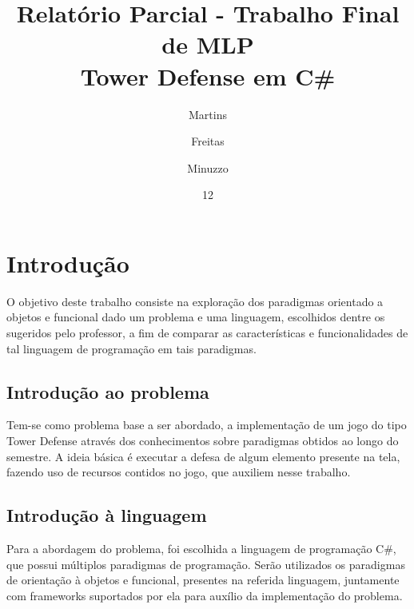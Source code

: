 \documentclass[rel_mlp]{iiufrgs}
\title{%
  Relatório Parcial - Trabalho Final de MLP \\
  \large Tower Defense em C#}
\author{Martins}{Pedro} %
\author{Freitas}{Pietra} %
\author{Minuzzo}{Thayná} %
\date{12}{2017}
\begin{document}
\maketitle      



\tableofcontents






%
\chapter{Introdução} \label{intro}

O objetivo deste trabalho consiste na exploração dos paradigmas orientado a objetos e funcional dado um problema e uma linguagem, escolhidos dentre os sugeridos pelo professor, a fim de comparar as características e funcionalidades de tal linguagem de programação em tais paradigmas. 

\section{Introdução ao problema}

Tem-se como problema base a ser abordado, a implementação de um jogo do tipo Tower Defense através dos conhecimentos sobre paradigmas obtidos ao longo do semestre. A ideia básica é executar a defesa de algum elemento presente na tela, fazendo uso de recursos contidos no jogo, que auxiliem nesse trabalho.  

\section{Introdução à linguagem}

Para a abordagem do problema, foi escolhida a linguagem de programação C#, que possui múltiplos paradigmas de programação. Serão utilizados os paradigmas de orientação à objetos e funcional, presentes na referida linguagem, juntamente com frameworks suportados por ela para auxílio da implementação do problema.
\end{document}
